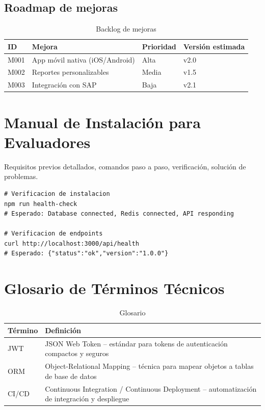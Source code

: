 \documentclass[a4paper,11pt,spanish]{article}
\begin{document}
\subsection{Roadmap de mejoras}

\begin{table}[H]
\centering
\caption{Backlog de mejoras}
\label{tab:roadmap}
\begin{tabular}{@{}llll@{}}
\toprule
\textbf{ID} & \textbf{Mejora} & \textbf{Prioridad} & \textbf{Versión estimada} \\
\midrule
M001 & App móvil nativa (iOS/Android) & Alta & v2.0 \\
M002 & Reportes personalizables & Media & v1.5 \\
M003 & Integración con SAP & Baja & v2.1 \\
\bottomrule
\end{tabular}
\end{table}

\newpage

\appendix

\section{Manual de Instalación para Evaluadores}

Requisitos previos detallados, comandos paso a paso, verificación, solución de problemas.

\begin{lstlisting}
# Verificacion de instalacion
npm run health-check
# Esperado: Database connected, Redis connected, API responding

# Verificacion de endpoints
curl http://localhost:3000/api/health
# Esperado: {"status":"ok","version":"1.0.0"}
\end{lstlisting}

\newpage

\section{Glosario de Términos Técnicos}

\begin{table}[H]
\centering
\caption{Glosario}
\label{tab:glosario}
\begin{tabular}{@{}ll@{}}
\toprule
\textbf{Término} & \textbf{Definición} \\
\midrule
JWT & JSON Web Token -- estándar para tokens de autenticación compactos y seguros \\
ORM & Object-Relational Mapping -- técnica para mapear objetos a tablas de base de datos \\
CI/CD & Continuous Integration / Continuous Deployment -- automatización de integración y despliegue \\
\bottomrule
\end{tabular}
\end{table}
\end{document}
